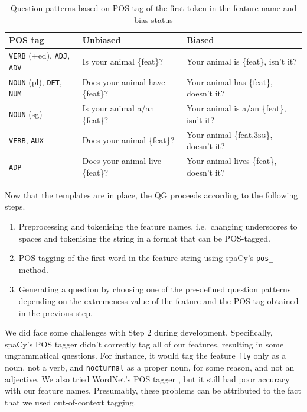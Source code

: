 \documentclass[11pt,a4paper]{article}
\begin{document}
\begin{table}[ht]
\centering
	\begin{tabularx}{\linewidth}{lLL}
		\toprule
		POS tag & Unbiased & Biased \\
		\midrule
		\texttt{VERB} (+ed), \texttt{ADJ}, \texttt{ADV} & Is your animal \{feat\}? & Your animal is \{feat\}, isn't it? \\
		\texttt{NOUN} (pl), \texttt{DET}, \texttt{NUM} & Does your animal have \{feat\}? & Your animal has \{feat\}, doesn't it? \\
		\texttt{NOUN} (sg) & Is your animal a/an \{feat\}? & Your animal is a/an \{feat\}, isn't it? \\
		\texttt{VERB}, \texttt{AUX} & Does your animal \{feat\}? & Your animal \{feat.\textsc{3sg}\}, doesn't it? \\
		\texttt{ADP} & Does your animal live \{feat\}? & Your animal lives \{feat\}, doesn't it? \\ 
		\bottomrule
	\end{tabularx}
\caption{Question patterns based on POS tag of the first token in the feature name and bias status}
\label{tab:question_patterns}
\end{table}

Now that the templates are in place, the QG proceeds according to the following steps.

\begin{enumerate}
  \item Preprocessing and tokenising the feature names, i.e.\ changing underscores to spaces and tokenising the string in a format that can be POS-tagged.
  \item POS-tagging of the first word in the feature string using spaCy's \texttt{pos\_} method.
  \item Generating a question by choosing one of the pre-defined question patterns depending on the extremeness value of the feature and the POS tag obtained in the previous step.
\end{enumerate}

We did face some challenges with Step 2 during development.
Specifically, spaCy's POS tagger didn't correctly tag all of our features, resulting in some ungrammatical questions.
For instance, it would tag the feature \texttt{fly} only as a noun, not a verb, and \texttt{nocturnal} as a proper noun, for some reason, and not an adjective.
We also tried WordNet's POS tagger \citep{Fellbaum2010}, but it still had poor accuracy with our feature names. 
Presumably, these problems can be attributed to the fact that we used out-of-context tagging.
\end{document}
